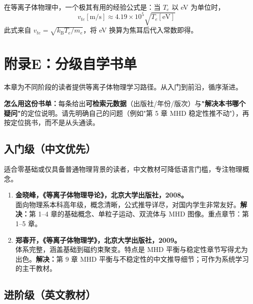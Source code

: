 \documentclass[12pt,a4paper,openany,oneside]{book}
\begin{document}
\begin{tip}
在等离子体物理中，一个极其有用的经验公式是：当 $T_e$ 以 eV 为单位时，
\begin{equation}
v_{te} [\text{m/s}] \approx 4.19\times 10^5\sqrt{T_e [\text{eV}]}
\end{equation}
此式来自 $v_{te}=\sqrt{k_\mathrm{B}T_e/m_e}$，将 eV 换算为焦耳后代入常数即得。
\end{tip}


\chapter*{附录E：分级自学书单}

本章为不同阶段的读者提供等离子体物理学习路径。从入门到前沿，循序渐进。

\textbf{怎么用这份书单：}每条给出\textbf{可检索元数据}（出版社/年份/版次）与\textbf{"解决本书哪个疑问"}的定位说明。请先明确自己的问题（例如"第 5 章 MHD 稳定性推不动"），再按定位挑书，而不是从头通读。


\section{入门级（中文优先）}

适合零基础或仅具备普通物理背景的读者，中文教材可降低语言门槛，专注物理概念。

\begin{enumerate}
\item \textbf{金晓峰，《等离子体物理导论》，北京大学出版社，2008。}\\
面向物理系本科高年级，概念清晰，公式推导详尽，对国内学生非常友好。\textbf{解决：}第 1--4 章的基础概念、单粒子运动、双流体与 MHD 图像。重点章节：第 1--5 章。

\item \textbf{郑春开，《等离子体物理学》，北京大学出版社，2009。}\\
体系完整，涵盖基础到磁约束聚变。特点是 MHD 平衡与稳定性章节写得尤为出色。\textbf{解决：}第 9 章 MHD 平衡与不稳定性的中文推导细节；可作为系统学习的主干教材。
\end{enumerate}


\section{进阶级（英文教材）}
\end{document}
